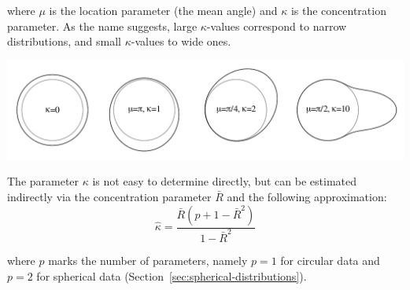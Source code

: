 \noindent where $\mu$ is the location parameter (the mean angle) and
$\kappa$ is the concentration parameter. As the name suggests, large
$\kappa$-values correspond to narrow distributions, and small
$\kappa$-values to wide ones.

\noindent\includegraphics[width=\textwidth]{../figures/vonMises.pdf}
\begingroup {}
\label{fig:vonMises}\endgroup

The parameter $\kappa$ is not easy to determine directly, but can be
estimated indirectly via the concentration parameter $\bar{R}$ and the
following approximation:
\begin{equation}
  \hat{\kappa} = \frac{\bar{R}(p+1-\bar{R}^2)}{1-\bar{R}^2}
  \label{eq:kappa}
\end{equation}

\noindent where $p$ marks the number of parameters, namely $p=1$ for
circular data and $p=2$ for spherical data
(Section~\ref{sec:spherical-distributions}).

